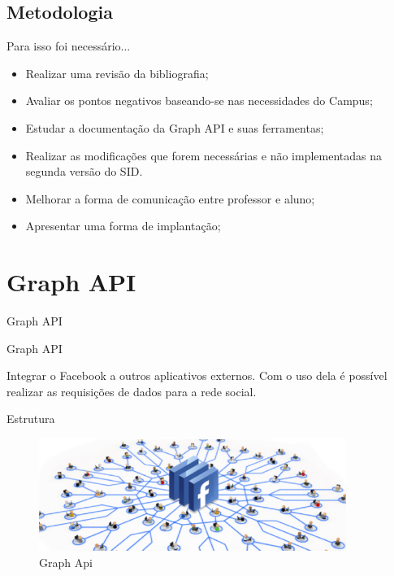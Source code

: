 \documentclass{aula-ifb}
\begin{document}
\subsection{Metodologia}
\begin{frame}{Para isso foi necessário...}
\begin{itemize}
   \item Realizar uma revisão da bibliografia;
   \vspace{10px	}
   \item Avaliar os pontos negativos baseando-se nas necessidades do Campus;
   \vspace{10px	}
   \item Estudar a documentação da Graph API e suas ferramentas;
   \vspace{10px}
   \item Realizar as modificações que forem necessárias e não implementadas na segunda versão do SID.
   \vspace{10px}
   \item Melhorar a forma de comunicação entre professor e aluno;
   \vspace{10px}
   \item Apresentar uma forma de implantação;
\end{itemize}
\end{frame}

\section{Graph API}
\begin{frame}
Graph API
\end{frame}

\begin{frame}{Graph API}
\begin{center}
Integrar o Facebook a outros aplicativos externos. Com o uso dela é possível realizar as requisições de dados para a rede social.
\end{center}
\end{frame}

\begin{frame}{Estrutura}
\begin{figure}[h]
\includegraphics[width=10cm]{figuras/facebookgraph.png}
\caption{Graph Api}
\label{fig:facebookgraph}
\end{figure}
\end{frame}
\end{document}
